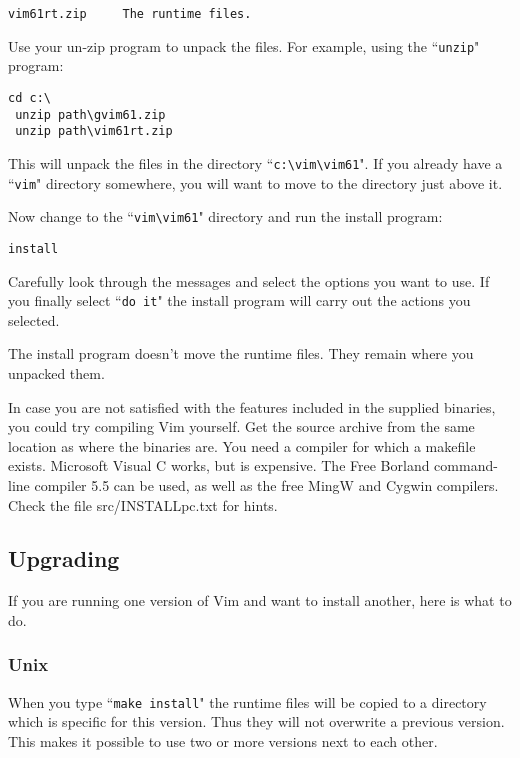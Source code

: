 \begin{Verbatim}[samepage=true]
    vim61rt.zip     The runtime files.
\end{Verbatim}

Use your un-zip program to unpack the files.
For example, using the ``\texttt{unzip}" program:

\begin{Verbatim}[samepage=true]
 cd c:\
 unzip path\gvim61.zip
 unzip path\vim61rt.zip
\end{Verbatim}

This will unpack the files in the directory ``\texttt{c:\textbackslash{}vim\textbackslash{}vim61}".
If you already have a ``\texttt{vim}" directory somewhere, you will want to move to the directory just above it.

Now change to the ``\texttt{vim\textbackslash{}vim61}" directory and run the install program:

\begin{Verbatim}[samepage=true]
 install
\end{Verbatim}

Carefully look through the messages and select the options you want to use.
If you finally select ``\texttt{do it}" the install program will carry out the actions you selected.

The install program doesn't move the runtime files.
They remain where you unpacked them.

In case you are not satisfied with the features included in the supplied binaries, you could try compiling Vim yourself.
Get the source archive from the same location as where the binaries are.
You need a compiler for which a makefile exists.
Microsoft Visual C works, but is expensive.
The Free Borland command-line compiler 5.5 can be used, as well as the free MingW and Cygwin compilers.
Check the file src/INSTALLpc.txt for hints.
\subsection{Upgrading}
If you are running one version of Vim and want to install another, here is what to do.
\subsubsection{Unix}
When you type ``\texttt{make install}" the runtime files will be copied to a directory which is specific for this version.
Thus they will not overwrite a previous version.
This makes it possible to use two or more versions next to each other.

